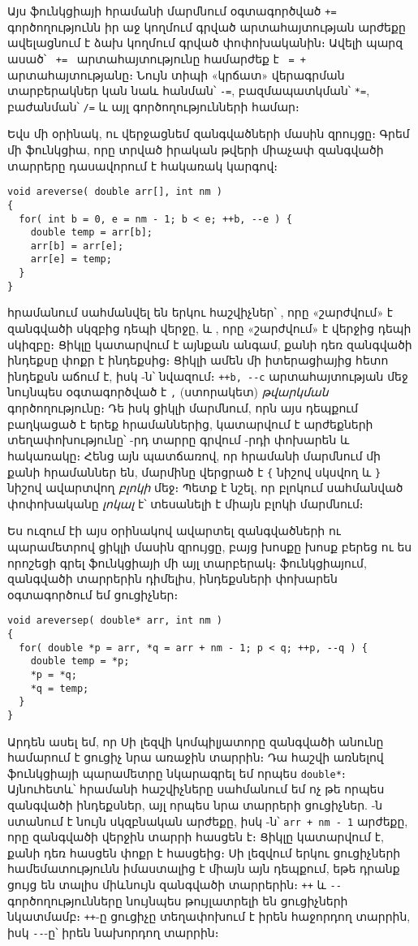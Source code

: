 Այս ֆունկցիայի  հրամանի մարմնում օգտագործված \Verb|+=| գործողությունն
իր աջ կողմում գրված արտահայտության արժեքը ավելացնում է ձախ կողմում գրված
փոփոխականին։ Ավելի պարզ ասած՝ \hbox{ \Verb|+=| }
արտահայտությունը համարժեք է
\hbox{ \Verb|=|  \Verb|+| }
արտահայտությանը։ Նույն տիպի «կրճատ» վերագրման տարբերակներ կան նաև հանման՝
\Verb|-=|, բազմապատկման՝ \Verb|*=|, բաժանման՝ \Verb|/=| և այլ
գործողությունների համար։

Եվս մի օրինակ, ու վերջացնեմ զանգվածների մասին զրույցը։ Գրեմ մի ֆունկցիա,
որը տրված իրական թվերի միաչափ զանգվածի տարրերը դասավորում է հակառակ կարգով։

\begin{Verbatim}
void areverse( double arr[], int nm )
{
  for( int b = 0, e = nm - 1; b < e; ++b, --e ) {
    double temp = arr[b];
    arr[b] = arr[e];
    arr[e] = temp;
  }
}
\end{Verbatim}

 հրամանում սահմանվել են երկու հաշվիչներ՝ , որը «շարժվում»
է զանգվածի սկզբից դեպի վերջը, և , որը «շարժվում» է վերջից դեպի
սկիզբը։ Ցիկլը կատարվում է այնքան անգամ, քանի դեռ զանգվածի  ինդեքսը
փոքր է  ինդեքսից։ Ցիկլի ամեն մի իտերացիայից հետո  ինդեքսն
աճում է, իսկ -ն՝ նվազում։ \Verb|++b, --c| արտահայտության մեջ
նույնպես օգտագործված է \Verb|,| (ստորակետ) \emph{թվարկման} գործողությունը։
Դե իսկ ցիկլի մարմնում, որն այս դեպքում բաղկացած է երեք հրամաններից, կատարվում
է արժեքների տեղափոխությունը՝ -րդ տարրը գրվում -րդի փոխարեն
և հակառակը։ Հենց այն պատճառով, որ  հրամանի մարմնում մի քանի հրամաններ
են, մարմինը վերցրած է \Verb|{| նիշով սկսվող և \Verb|}| նիշով ավարտվող
\emph{բլոկի} մեջ։ Պետք է նշել, որ բլոկում սահմանված փոփոխականը \emph{լոկալ}
է՝ տեսանելի է միայն բլոկի մարմնում։

Ես ուզում էի այս օրինակով ավարտել զանգվածների ու պարամետրով ցիկլի մասին
զրույցը, բայց խոսքը խոսք բերեց ու ես որոշեցի գրել 
ֆունկցիայի մի այլ տարբերակ։  ֆունկցիայում, զանգվածի
տարրերին դիմելիս, ինդեքսների փոխարեն օգտագործում եմ ցուցիչներ։

\begin{Verbatim}
void areversep( double* arr, int nm )
{
  for( double *p = arr, *q = arr + nm - 1; p < q; ++p, --q ) {
    double temp = *p;
    *p = *q;
    *q = temp;
  }
}
\end{Verbatim}

Արդեն ասել եմ, որ Սի լեզվի կոմպիլյատորը զանգվածի անունը համարում է ցուցիչ
նրա առաջին տարրին։ Դա հաշվի առնելով  ֆունկցիայի 
պարամետրը նկարագրել եմ որպես \Verb|double*|։ Այնուհետև՝  հրամանի
հաշվիչները սահմանում եմ ոչ թե որպես զանգվածի ինդեքսներ, այլ որպես նրա տարրերի
ցուցիչներ. -ն ստանում է նույն  սկզբնական արժեքը, իսկ
-ն՝ \Verb|arr + nm - 1| արժեքը, որը զանգվածի վերջին տարրի հասցեն է։
Ցիկլը կատարվում է, քանի դեռ  հասցեն փոքր է  հասցեից։ Սի
լեզվում երկու ցուցիչների համեմատությունն իմաստալից է միայն այն դեպքում, եթե
դրանք ցույց են տալիս միևնույն զանգվածի տարրերին։ \Verb|++| և \Verb|--|
գործողությունները նույնպես թույլատրելի են ցուցիչների նկատմամբ։ \Verb|++|-ը
ցուցիչը տեղափոխում է իրեն հաջորդող տարրին, իսկ \Verb|--|-ը՝ իրեն նախորդող
տարրին։
